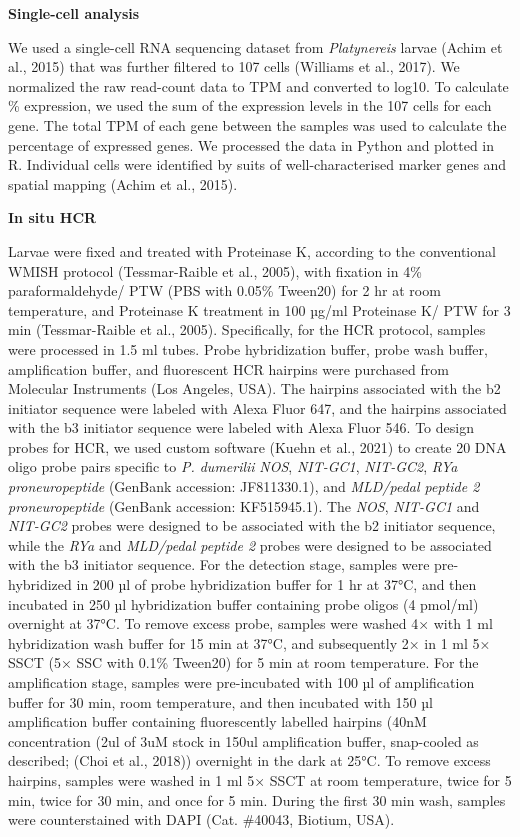\documentclass[
  10pt,
  onecolumn]{article}
\begin{document}
\textbf{Single-cell analysis}

We used a single-cell RNA sequencing dataset from \emph{Platynereis}
larvae (Achim et al., 2015) that was further filtered to 107 cells
(Williams et al., 2017). We normalized the raw read-count data to TPM
and converted to log10. To calculate \% expression, we used the sum of
the expression levels in the 107 cells for each gene. The total TPM of
each gene between the samples was used to calculate the percentage of
expressed genes. We processed the data in Python and plotted in R.
Individual cells were identified by suits of well-characterised marker
genes and spatial mapping (Achim et al., 2015).

\textbf{In situ HCR}

Larvae were fixed and treated with Proteinase K, according to the
conventional WMISH protocol (Tessmar-Raible et al., 2005), with fixation
in 4\% paraformaldehyde/ PTW (PBS with 0.05\% Tween20) for 2 hr at room
temperature, and Proteinase K treatment in 100 µg/ml Proteinase K/ PTW
for 3 min (Tessmar-Raible et al., 2005). Specifically, for the HCR
protocol, samples were processed in 1.5 ml tubes. Probe hybridization
buffer, probe wash buffer, amplification buffer, and fluorescent HCR
hairpins were purchased from Molecular Instruments (Los Angeles, USA).
The hairpins associated with the b2 initiator sequence were labeled with
Alexa Fluor 647, and the hairpins associated with the b3 initiator
sequence were labeled with Alexa Fluor 546. To design probes for HCR, we
used custom software (Kuehn et al., 2021) to create 20 DNA oligo probe
pairs specific to \emph{P. dumerilii} \emph{NOS}, \emph{NIT-GC1},
\emph{NIT-GC2}, \emph{RYa proneuropeptide} (GenBank accession:
JF811330.1), and \emph{MLD/pedal peptide 2 proneuropeptide} (GenBank
accession: KF515945.1). The \emph{NOS}, \emph{NIT-GC1} and
\emph{NIT-GC2} probes were designed to be associated with the b2
initiator sequence, while the \emph{RYa} and \emph{MLD/pedal peptide 2}
probes were designed to be associated with the b3 initiator sequence.
For the detection stage, samples were pre-hybridized in 200 µl of probe
hybridization buffer for 1 hr at 37°C, and then incubated in 250 µl
hybridization buffer containing probe oligos (4 pmol/ml) overnight at
37°C. To remove excess probe, samples were washed 4× with 1 ml
hybridization wash buffer for 15 min at 37°C, and subsequently 2× in 1
ml 5× SSCT (5× SSC with 0.1\% Tween20) for 5 min at room temperature.
For the amplification stage, samples were pre-incubated with 100 µl of
amplification buffer for 30 min, room temperature, and then incubated
with 150 µl amplification buffer containing fluorescently labelled
hairpins (40nM concentration (2ul of 3uM stock in 150ul amplification
buffer, snap-cooled as described; (Choi et al., 2018)) overnight in the
dark at 25°C. To remove excess hairpins, samples were washed in 1 ml 5×
SSCT at room temperature, twice for 5 min, twice for 30 min, and once
for 5 min. During the first 30 min wash, samples were counterstained
with DAPI (Cat. \#40043, Biotium, USA).
\end{document}
